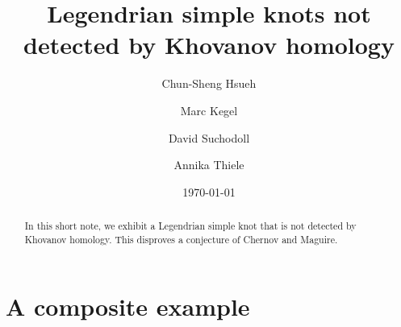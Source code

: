 \documentclass{amsart} %
\theoremstyle{thm}
\theoremstyle{definition}
\numberwithin{equation}{section}
\begin{document}
\title{Legendrian simple knots not detected by Khovanov homology}

\author{Chun-Sheng Hsueh}
\address{Humboldt-Universit\"at zu Berlin, Rudower Chaussee 25, 12489 Berlin, Germany}

\author{Marc Kegel}
\address{Universidad de Sevilla, Dpto.\ de Álgebra,
Avda.\ Reina Mercedes s/n,
41012 Sevilla, Spain}

\author{David Suchodoll}

\author{Annika Thiele}
\address{École Polytechnique Fédérale de Lausanne, UPHESS, Station 8, CH-1015 Lausanne, Switzerland}



\date{\today} %

\begin{abstract}
In this short note, we exhibit a Legendrian simple knot that is not detected by Khovanov homology. This disproves a conjecture of Chernov and Maguire.
\end{abstract}


\makeatletter
{}
\makeatother%



\maketitle

\section{A composite example}
\end{document}
